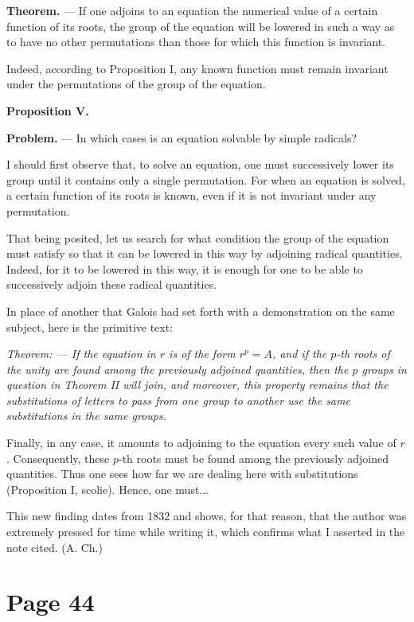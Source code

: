 \documentclass{article}
\begin{document}
\textbf{Theorem.} --- If one adjoins to an equation the numerical value of a certain function of its roots, the group of the equation will be lowered in such a way as to have no other permutations than those for which this function is invariant.

Indeed, according to Proposition I, any known function must remain invariant under the permutations of the group of the equation.

\textbf{Proposition V.}

\textbf{Problem.} --- In which cases is an equation solvable by simple radicals?

I should first observe that, to solve an equation, one must successively lower its group until it contains only a single permutation. For when an equation is solved, a certain function of its roots is known, even if it is not invariant under any permutation.

That being posited, let us search for what condition the group of the equation must satisfy so that it can be lowered in this way by adjoining radical quantities. Indeed, for it to be lowered in this way, it is enough for one to be able to successively adjoin these radical quantities.

In place of another that Galois had set forth with a demonstration on the same subject, here is the primitive text:

\emph{Theorem: --- If the equation in $r$ is of the form $r^p = A$, and if the $p$-th roots of the unity are found among the previously adjoined quantities, then the $p$ groups in question in Theorem II will join, and moreover, this property remains that the substitutions of letters to pass from one group to another use the same substitutions in the same groups.}

Finally, in any case, it amounts to adjoining to the equation every such value of $r$. Consequently, these $p$-th roots must be found among the previously adjoined quantities. Thus one sees how far we are dealing here with substitutions (Proposition I, scolie). Hence, one must...

This new finding dates from 1832 and shows, for that reason, that the author was extremely pressed for time while writing it, which confirms what I asserted in the note cited. (A. Ch.)

\section*{Page 44}
\end{document}
